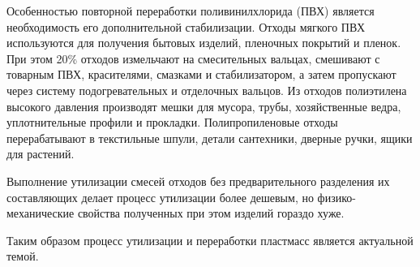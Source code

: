 Особенностью повторной переработки поливинилхлорида (ПВХ) является необходимость
его дополнительной стабилизации. Отходы мягкого ПВХ используются для получения
бытовых изделий, пленочных покрытий и пленок. При этом 20\% отходов измельчают
на смесительных вальцах, смешивают с товарным ПВХ, красителями, смазками и
стабилизатором, а затем пропускают через систему подогревательных и отделочных
вальцов. Из отходов полиэтилена высокого давления производят мешки для мусора,
трубы, хозяйственные ведра, уплотнительные профили и прокладки. Полипропиленовые
отходы перерабатывают в текстильные шпули, детали сантехники, дверные ручки, ящики для растений.

Выполнение утилизации смесей отходов без предварительного разделения их
составляющих делает процесс утилизации более дешевым, но физико-механические
свойства полученных при этом изделий гораздо хуже.

Таким образом процесс утилизации и переработки пластмасс является актуальной темой.
